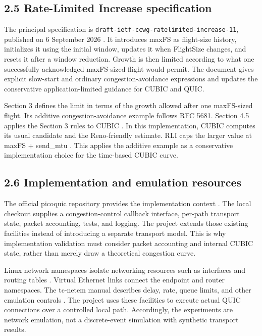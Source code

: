 \subsection*{2.5 Rate-Limited Increase specification}

The principal specification is \nolinkurl{draft-ietf-ccwg-ratelimited-increase-11}, published on 6 September 2026 \cite{ref1}. It introduces maxFS as flight-size history, initializes it using the initial window, updates it when FlightSize changes, and resets it after a window reduction. Growth is then limited according to what one successfully acknowledged maxFS-sized flight would permit. The document gives explicit slow-start and ordinary congestion-avoidance expressions and updates the conservative application-limited guidance for CUBIC and QUIC.


Section 3 defines the limit in terms of the growth allowed after one maxFS-sized flight. Its additive congestion-avoidance example follows RFC 5681. Section 4.5 applies the Section 3 rules to CUBIC \cite{ref1}. In this implementation, CUBIC computes its usual candidate and the Reno-friendly estimate. RLI caps the larger value at maxFS + send\_mtu \cite{ref12}. This applies the additive example as a conservative implementation choice for the time-based CUBIC curve.


\subsection*{2.6 Implementation and emulation resources}

The official picoquic repository provides the implementation context \cite{ref8}. The local checkout supplies a congestion-control callback interface, per-path transport state, packet accounting, tests, and logging. The project extends those existing facilities instead of introducing a separate transport model. This is why implementation validation must consider packet accounting and internal CUBIC state, rather than merely draw a theoretical congestion curve.


Linux network namespaces isolate networking resources such as interfaces and routing tables \cite{ref9}. Virtual Ethernet links connect the endpoint and router namespaces. The tc-netem manual describes delay, rate, queue limits, and other emulation controls \cite{ref10}. The project uses these facilities to execute actual QUIC connections over a controlled local path. Accordingly, the experiments are network emulation, not a discrete-event simulation with synthetic transport results.


\label{sec:literature-end}
